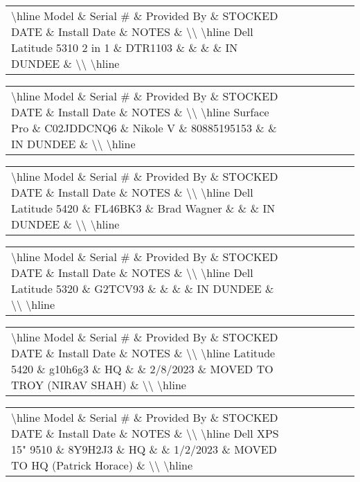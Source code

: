 \documentclass{article}%
\begin{document}
\begin{tabularx}{\textwidth}{|X|X|X|X|X|X|X|}%
\textbackslash{}hline%
Model \& Serial \# \& Provided By \& STOCKED DATE \& Install Date \& NOTES \&  \textbackslash{}\textbackslash{}%
\textbackslash{}hline%
Dell Latitude 5310 2 in 1 \& DTR1103 \&  \&  \&  \& IN DUNDEE \&  \textbackslash{}\textbackslash{}%
\textbackslash{}hline%
\end{tabularx}%
\begin{tabularx}{\textwidth}{|X|X|X|X|X|X|X|}%
\textbackslash{}hline%
Model \& Serial \# \& Provided By \& STOCKED DATE \& Install Date \& NOTES \&  \textbackslash{}\textbackslash{}%
\textbackslash{}hline%
Surface Pro \& C02JDDCNQ6 \& Nikole V \& 80885195153 \&  \& IN DUNDEE \&  \textbackslash{}\textbackslash{}%
\textbackslash{}hline%
\end{tabularx}%
\begin{tabularx}{\textwidth}{|X|X|X|X|X|X|X|}%
\textbackslash{}hline%
Model \& Serial \# \& Provided By \& STOCKED DATE \& Install Date \& NOTES \&  \textbackslash{}\textbackslash{}%
\textbackslash{}hline%
Dell Latitude 5420 \& FL46BK3 \& Brad Wagner \&  \&  \& IN DUNDEE \&  \textbackslash{}\textbackslash{}%
\textbackslash{}hline%
\end{tabularx}%
\begin{tabularx}{\textwidth}{|X|X|X|X|X|X|X|}%
\textbackslash{}hline%
Model \& Serial \# \& Provided By \& STOCKED DATE \& Install Date \& NOTES \&  \textbackslash{}\textbackslash{}%
\textbackslash{}hline%
Dell Latitude 5320 \& G2TCV93 \&  \&  \&  \& IN DUNDEE \&  \textbackslash{}\textbackslash{}%
\textbackslash{}hline%
\end{tabularx}%
\begin{tabularx}{\textwidth}{|X|X|X|X|X|X|X|}%
\textbackslash{}hline%
Model \& Serial \# \& Provided By \& STOCKED DATE \& Install Date \& NOTES \&  \textbackslash{}\textbackslash{}%
\textbackslash{}hline%
Latitude 5420 \& g10h6g3 \& HQ \&  \& 2/8/2023 \& MOVED TO TROY (NIRAV SHAH) \&  \textbackslash{}\textbackslash{}%
\textbackslash{}hline%
\end{tabularx}%
\begin{tabularx}{\textwidth}{|X|X|X|X|X|X|X|}%
\textbackslash{}hline%
Model \& Serial \# \& Provided By \& STOCKED DATE \& Install Date \& NOTES \&  \textbackslash{}\textbackslash{}%
\textbackslash{}hline%
Dell XPS 15" 9510 \& 8Y9H2J3 \& HQ \&  \& 1/2/2023 \& MOVED TO HQ (Patrick Horace) \&  \textbackslash{}\textbackslash{}%
\textbackslash{}hline%
\end{tabularx}
\end{document}
